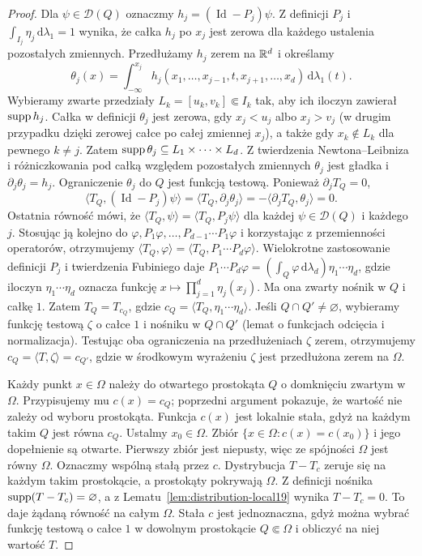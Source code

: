 \begin{proof}
Dla $\psi\in\mathcal D(Q)$ oznaczmy
$h_j=(\operatorname{Id}-P_j)\psi$.
Z definicji $P_j$ i $\int_{I_j}\eta_j\,\mathrm d\lambda_1=1$
wynika, że całka $h_j$ po $x_j$ jest zerowa dla każdego
ustalenia pozostałych zmiennych.
Przedłużamy $h_j$ zerem na $\mathbb R^d$ i określamy
\[
\theta_j(x)=\int_{-\infty}^{x_j}
h_j(x_1,\ldots,x_{j-1},t,x_{j+1},\ldots,x_d)\,
\mathrm d\lambda_1(t).
\]
Wybieramy zwarte przedziały $L_k=[u_k,v_k]\Subset I_k$
tak, aby ich iloczyn zawierał $\operatorname{supp} h_j$.
Całka w definicji $\theta_j$ jest zerowa, gdy
$x_j<u_j$ albo $x_j>v_j$ (w drugim przypadku dzięki
zerowej całce po całej zmiennej $x_j$), a także gdy
$x_k\notin L_k$ dla pewnego $k\ne j$.
Zatem $\operatorname{supp}\theta_j\subseteq L_1\times\cdots\times L_d$.
Z twierdzenia Newtona--Leibniza i różniczkowania pod całką
względem pozostałych zmiennych $\theta_j$ jest gładka i
$\partial_j\theta_j=h_j$. Ograniczenie $\theta_j$ do $Q$
jest funkcją testową. Ponieważ $\partial_jT_Q=0$,
\[
\langle T_Q,(\operatorname{Id}-P_j)\psi\rangle
=\langle T_Q,\partial_j\theta_j\rangle
=-\langle\partial_jT_Q,\theta_j\rangle=0.
\]
Ostatnia równość mówi, że
$\langle T_Q,\psi\rangle=\langle T_Q,P_j\psi\rangle$
dla każdej $\psi\in\mathcal D(Q)$ i każdego $j$.
Stosując ją kolejno do $\varphi,P_1\varphi,\ldots,
P_{d-1}\cdots P_1\varphi$ i korzystając z przemienności
operatorów, otrzymujemy
$\langle T_Q,\varphi\rangle=\langle T_Q,P_1\cdots P_d\varphi\rangle$.
Wielokrotne zastosowanie definicji $P_j$ i twierdzenia
Fubiniego daje
$P_1\cdots P_d\varphi=(\int_Q\varphi\,\mathrm d\lambda_d)
\eta_1\cdots\eta_d$, gdzie iloczyn $\eta_1\cdots\eta_d$
oznacza funkcję $x\mapsto\prod_{j=1}^d\eta_j(x_j)$.
Ma ona zwarty nośnik w $Q$ i całkę $1$.
Zatem $T_Q=T_{c_Q}$, gdzie
$c_Q=\langle T_Q,\eta_1\cdots\eta_d\rangle$.
Jeśli $Q\cap Q'\ne\varnothing$, wybieramy funkcję testową
$\zeta$ o całce $1$ i nośniku w $Q\cap Q'$ (lemat o
funkcjach odcięcia i normalizacja). Testując oba ograniczenia
na przedłużeniach $\zeta$ zerem, otrzymujemy
$c_Q=\langle T,\zeta\rangle=c_{Q'}$, gdzie w środkowym
wyrażeniu $\zeta$ jest przedłużona zerem na $\Omega$.

Każdy punkt $x\in\Omega$ należy do otwartego prostokąta
$Q$ o domknięciu zwartym w $\Omega$. Przypisujemy mu
$c(x)=c_Q$; poprzedni argument pokazuje, że wartość nie
zależy od wyboru prostokąta. Funkcja $c(x)$ jest lokalnie
stała, gdyż na każdym takim $Q$ jest równa $c_Q$.
Ustalmy $x_0\in\Omega$. Zbiór
$\{x\in\Omega:c(x)=c(x_0)\}$ i jego dopełnienie są otwarte.
Pierwszy zbiór jest niepusty, więc ze spójności $\Omega$
jest równy $\Omega$. Oznaczmy wspólną stałą przez $c$.
Dystrybucja $T-T_c$ zeruje się na każdym takim prostokącie,
a prostokąty pokrywają $\Omega$. Z definicji nośnika
$\operatorname{supp}(T-T_c)=\varnothing$, a z Lematu~\ref{lem:distribution-local19}
wynika $T-T_c=0$. To daje żądaną równość na całym $\Omega$.
Stała $c$ jest jednoznaczna, gdyż można wybrać funkcję
testową o całce $1$ w dowolnym prostokącie $Q\Subset\Omega$
i obliczyć na niej wartość $T$.
\end{proof}

